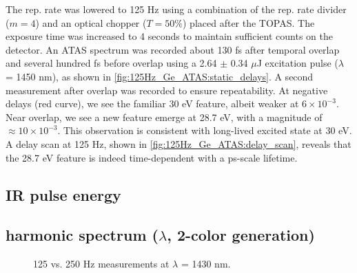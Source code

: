 The rep. rate was lowered to 125 Hz using a combination of the rep. rate divider ($m=4$) and an optical chopper ($T = 50\%$) placed after the TOPAS. The exposure time was increased to 4 seconds to maintain sufficient counts on the detector. An ATAS spectrum was recorded about 130 fs after temporal overlap and several hundred fs before overlap using a 2.64 $\pm$ 0.34 $\mu$J excitation pulse ($\lambda$ = 1450 nm), as shown in \cref{fig:125Hz_Ge_ATAS:static_delays}. A second measurement after overlap was recorded to ensure repeatability. At negative delays (red curve), we see the familiar 30 eV feature, albeit weaker at $6 \times 10^{-3}$. Near overlap, we see a new feature emerge at 28.7 eV, with a magnitude of $\approx 10 \times 10^{-3}$. This observation is consistent with long-lived excited state at 30 eV. A delay scan at 125 Hz, shown in \cref{fig:125Hz_Ge_ATAS:delay_scan}, reveals that the 28.7 eV feature is indeed time-dependent with a ps-scale lifetime.


\subsection{IR pulse energy}

\subsection{harmonic spectrum ($\lambda$, 2-color generation)}

\begin{figure}
	\centering
	\qquad
	
	\caption{125 vs. 250 Hz measurements at $\lambda$ = 1430 nm. }
	\label{fig:125vs250Hz_1430nm_Ge_ATAS:delay}
\end{figure}

